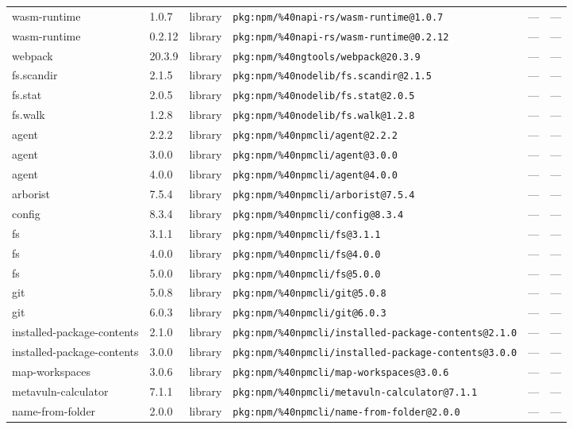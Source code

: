 \documentclass[11pt]{article}
\begin{document}
\begin{longtable}{|l|l|l|p{2.2cm}|l|p{4cm}|}
wasm-runtime & 1.0.7 & library & \texttt{pkg:npm/\%40napi-rs/wasm-runtime@1.0.7} & — & — \\
wasm-runtime & 0.2.12 & library & \texttt{pkg:npm/\%40napi-rs/wasm-runtime@0.2.12} & — & — \\
webpack & 20.3.9 & library & \texttt{pkg:npm/\%40ngtools/webpack@20.3.9} & — & — \\
fs.scandir & 2.1.5 & library & \texttt{pkg:npm/\%40nodelib/fs.scandir@2.1.5} & — & — \\
fs.stat & 2.0.5 & library & \texttt{pkg:npm/\%40nodelib/fs.stat@2.0.5} & — & — \\
fs.walk & 1.2.8 & library & \texttt{pkg:npm/\%40nodelib/fs.walk@1.2.8} & — & — \\
agent & 2.2.2 & library & \texttt{pkg:npm/\%40npmcli/agent@2.2.2} & — & — \\
agent & 3.0.0 & library & \texttt{pkg:npm/\%40npmcli/agent@3.0.0} & — & — \\
agent & 4.0.0 & library & \texttt{pkg:npm/\%40npmcli/agent@4.0.0} & — & — \\
arborist & 7.5.4 & library & \texttt{pkg:npm/\%40npmcli/arborist@7.5.4} & — & — \\
config & 8.3.4 & library & \texttt{pkg:npm/\%40npmcli/config@8.3.4} & — & — \\
fs & 3.1.1 & library & \texttt{pkg:npm/\%40npmcli/fs@3.1.1} & — & — \\
fs & 4.0.0 & library & \texttt{pkg:npm/\%40npmcli/fs@4.0.0} & — & — \\
fs & 5.0.0 & library & \texttt{pkg:npm/\%40npmcli/fs@5.0.0} & — & — \\
git & 5.0.8 & library & \texttt{pkg:npm/\%40npmcli/git@5.0.8} & — & — \\
git & 6.0.3 & library & \texttt{pkg:npm/\%40npmcli/git@6.0.3} & — & — \\
installed-package-contents & 2.1.0 & library & \texttt{pkg:npm/\%40npmcli/installed-package-contents@2.1.0} & — & — \\
installed-package-contents & 3.0.0 & library & \texttt{pkg:npm/\%40npmcli/installed-package-contents@3.0.0} & — & — \\
map-workspaces & 3.0.6 & library & \texttt{pkg:npm/\%40npmcli/map-workspaces@3.0.6} & — & — \\
metavuln-calculator & 7.1.1 & library & \texttt{pkg:npm/\%40npmcli/metavuln-calculator@7.1.1} & — & — \\
name-from-folder & 2.0.0 & library & \texttt{pkg:npm/\%40npmcli/name-from-folder@2.0.0} & — & — \\

\end{longtable}
\end{document}
